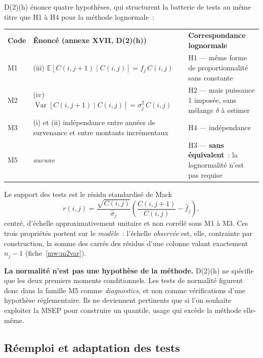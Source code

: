 \documentclass[a4paper,11pt]{article}
\begin{document}
D(2)(h) énonce quatre hypothèses, qui structurent la batterie de tests
au même titre que H1 à H4 pour la méthode lognormale~:

\begin{center}
\small
{}
\begin{tabular}{@{}p{1.5cm}p{6.6cm}p{6.7cm}@{}}
\rowcolor{tableheader}
\textcolor{financeblue}{\textbf{Code}} &
\textcolor{financeblue}{\textbf{Énoncé (annexe XVII, D(2)(h))}} &
\textcolor{financeblue}{\textbf{Correspondance lognormale}} \\
M1 & (iii) $\mathbb{E}[C(i,j+1)\mid C(i,j)] = f_j\,C(i,j)$ &
H1 --- même forme de proportionnalité sans constante \\
M2 & (iv) $\operatorname{Var}[C(i,j+1)\mid C(i,j)] = \sigma_j^2\,C(i,j)$ &
H2 --- mais puissance 1 imposée, sans mélange $\delta$ à estimer \\
M3 & (i) et (ii) indépendance entre années de survenance et entre montants
incrémentaux & H4 --- indépendance \\
M5 & \emph{aucune} & H3 --- \textbf{sans équivalent}~: la lognormalité n'est
pas requise \\
\end{tabular}
\end{center}

Le support des tests est le résidu standardisé de Mack
\[
  r(i,j) = \frac{\sqrt{C(i,j)}}{\hat\sigma_j}
  \left(\frac{C(i,j+1)}{C(i,j)} - \hat f_j\right),
\]
centré, d'échelle approximativement unitaire et non corrélé sous M1 à M3. Ces
trois propriétés portent sur le \emph{modèle}~: l'échelle \emph{observée} est,
elle, contrainte par construction, la somme des carrés des résidus d'une colonne
valant exactement $n_j - 1$ (fiche~\ref{mw:m2var}).

\begin{encadre}
\textbf{La normalité n'est pas une hypothèse de la méthode.} D(2)(h)
ne spécifie que les deux premiers moments conditionnels. Les tests de normalité
figurent donc dans la famille M5 comme \emph{diagnostics}, et non comme
vérifications d'une hypothèse réglementaire. Ils ne deviennent pertinents que si
l'on souhaite exploiter la MSEP pour construire un quantile, usage qui excède la
méthode elle-même.
\end{encadre}

\subsection{Réemploi et adaptation des tests}
\end{document}
